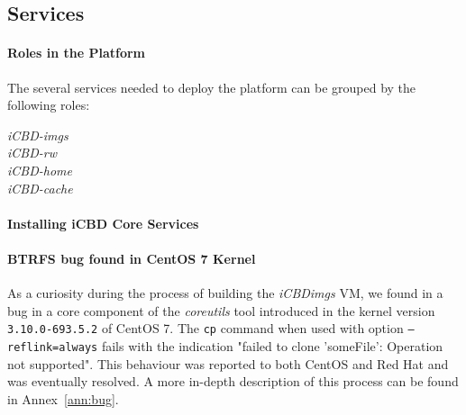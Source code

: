 
\subsection{Services}
\label{sub:impl_cache_services}

\paragraph{Roles in the Platform}
\label{par:impl_roles}

The several services needed to deploy the platform can be grouped by the following roles:

\begin{description}
	\item [\textit{iCBD-imgs}]
	\item [\textit{iCBD-rw}]
	\item [\textit{iCBD-home}]
	\item [\textit{iCBD-cache}]
\end{description}

\paragraph{Installing iCBD Core Services}
\label{par:impl_install_icbd_core}

\paragraph{BTRFS bug found in CentOS 7 Kernel}
\label{par:impl_centos_bug}

As a curiosity during the process of building the \textit{iCBDimgs} VM, we found in a bug in a core component of the \textit{coreutils} tool introduced in the kernel version \texttt{3.10.0-693.5.2} of CentOS 7. The \texttt{cp} command when used with option \texttt{--reflink=always} fails with the indication "failed to clone 'someFile': Operation not supported". This behaviour was reported to both CentOS and Red Hat and was eventually resolved. A more in-depth description of this process can be found in Annex~\ref{ann:bug}.







